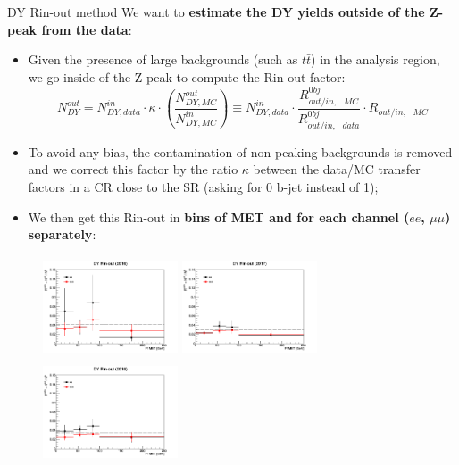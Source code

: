 \documentclass[8pt]{beamer}
\begin{document}
\begin{frame}{DY Rin-out method}
\justifying
We want to \textbf{estimate the DY yields outside of the Z-peak from the data}:

\begin{itemize}
\justifying
\item Given the presence of large backgrounds (such as $t \bar t$) in the analysis region, we go inside of the Z-peak to compute the \alert{Rin-out factor}:
\begin{equation*}
N^{out}_{DY} = N^{in}_{DY, data} \cdot \kappa \cdot \left (\frac{N^{out}_{DY, MC}}{N^{in}_{DY, MC}} \right ) \equiv N^{in}_{DY, data} \cdot \frac{R_{out/in,\text{ } MC}^{0bj}}{R_{out/in,\text{ } data}^{0bj}} \cdot R_{out/in,\text{ } MC}
\end{equation*}
\item To avoid any bias, the contamination of non-peaking backgrounds is removed and we correct this factor by the ratio $\kappa$ between the data/MC transfer factors in a CR close to the SR (asking for 0 b-jet instead of 1);
\item We then get this Rin-out in \textbf{bins of MET and for each channel ($ee$, $\mu \mu$) separately}:
\end{itemize}

\begin{figure}[htbp]
\begin{center}
\begin{minipage}[b]{.32\textwidth}
\includegraphics[width=4cm, height=3cm]{figs/Rinout2016.png}
\end{minipage} \hfill
\begin{minipage}[b]{.32\textwidth}
\includegraphics[width=4cm, height=3cm]{figs/Rinout2017.png}
\end{minipage} \hfill
\begin{minipage}[b]{.32\textwidth}
\includegraphics[width=4cm, height=3cm]{figs/Rinout2018.png}
\end{minipage} \hfill
\end{center}
\end{figure} \vfill


\end{frame}
\end{document}
